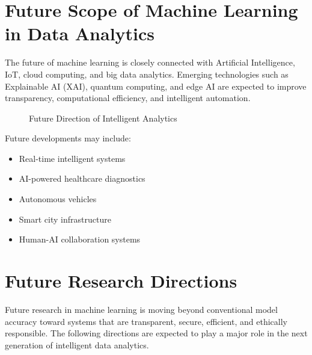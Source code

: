 \documentclass[11pt,a4paper]{article}
\begin{document}

\section{Future Scope of Machine Learning in Data Analytics}

The future of machine learning is closely connected with Artificial Intelligence, IoT, cloud computing, and big data analytics. Emerging technologies such as Explainable AI (XAI), quantum computing, and edge AI are expected to improve transparency, computational efficiency, and intelligent automation.

\begin{figure}[H]
\centering
{}
\caption{Future Direction of Intelligent Analytics}
\end{figure}

Future developments may include:
\begin{itemize}
    \item Real-time intelligent systems
    \item AI-powered healthcare diagnostics
    \item Autonomous vehicles
    \item Smart city infrastructure
    \item Human-AI collaboration systems
\end{itemize}


\section{Future Research Directions}

Future research in machine learning is moving beyond conventional model accuracy toward systems that are transparent, secure, efficient, and ethically responsible. The following directions are expected to play a major role in the next generation of intelligent data analytics.
\end{document}
